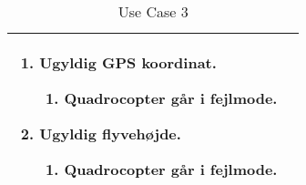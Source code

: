 \begin{table}[H]
\begin{tabular}{|l|p{10cm}|}
									\renewcommand{\labelenumi}{\Roman{enumi}:}
									\renewcommand{\labelenumii}{\alph{enumii})}
									\begin{enumerate}[topsep=0.0cm,leftmargin=0.5cm]
										\item Ugyldig GPS koordinat.
											\begin{enumerate}[topsep=0cm, leftmargin=1cm]
												\item Quadrocopter går i fejlmode.
											\end{enumerate}
										\item Ugyldig flyvehøjde.
											\begin{enumerate}[topsep=0cm, leftmargin=1cm]
												\item Quadrocopter går i fejlmode.
											\end{enumerate}
									\end{enumerate} \\\hline	

\end{tabular}
\caption{Use Case 3}
\label{tab:UC3}
\end{table}